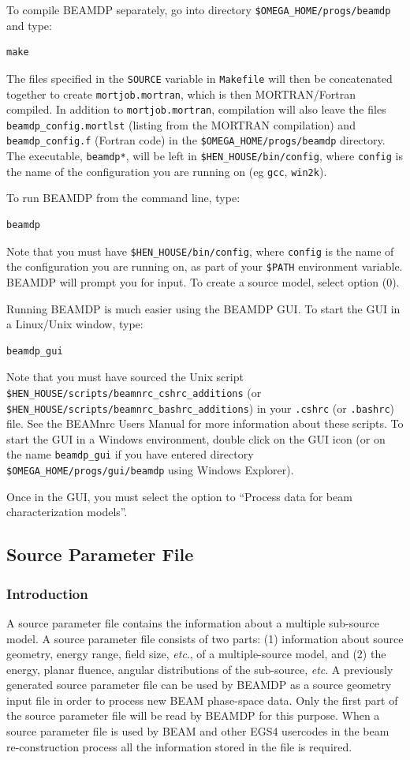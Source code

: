 \documentclass[12pt,twoside]{article}
\newcommand{\etc}{{\em etc}}
\begin{document}
To compile BEAMDP separately, go into directory {\tt \$OMEGA\_HOME/progs/beamdp}
and type:
\begin{verbatim}
make
\end{verbatim}
The files specified in the {\tt SOURCE} variable in {\tt Makefile}
will then be concatenated together to create {\tt mortjob.mortran}, which
is then MORTRAN/Fortran compiled.  In addition to {\tt mortjob.mortran},
compilation will also leave the files {\tt beamdp\_config.mortlst}
(listing from the MORTRAN compilation) and
{\tt beamdp\_config.f} (Fortran code) in the
{\tt \$OMEGA\_HOME/progs/beamdp} directory.  The executable, {\tt beamdp*},
will be left in {\tt \$HEN\_HOUSE/bin/config}, where {\tt config} is the
name of the configuration you are running on (eg {\tt gcc}, {\tt win2k}).

To run BEAMDP from the command line, type:
\begin{verbatim}
beamdp
\end{verbatim}
Note that you must
have {\tt \$HEN\_HOUSE/bin/config}, where {\tt config} is the name
of the configuration you are running on, as part of your {\tt \$PATH}
environment variable.
BEAMDP will prompt you for input.  To create a source model, select
option (0).

Running BEAMDP is much easier using the BEAMDP GUI\cite{Tr04}.  To start the GUI in
a Linux/Unix window, type:
\begin{verbatim}
beamdp_gui
\end{verbatim}
Note that you must have sourced the Unix script
{\tt \$HEN\_HOUSE/scripts/beamnrc\_cshrc\_additions} (or
{\tt \$HEN\_HOUSE/scripts/beamnrc\_bashrc\_additions}) in your
{\tt .cshrc} (or {\tt .bashrc}) file.  See the BEAMnrc Users Manual\cite{Ro04a}
for more information about these scripts.  To start the GUI in a Windows
environment, double click on the GUI icon (or on the name
{\tt beamdp\_gui} if you have entered directory
{\tt \$OMEGA\_HOME/progs/gui/beamdp} using Windows Explorer).

Once in the GUI, you must select the option to
``Process data for beam characterization models''.

\subsection{Source Parameter File}

\subsubsection{Introduction}
A source parameter file contains the information about a multiple sub-source model. A source parameter file consists of two parts: (1) information about source geometry, energy range, field size, \etc., of a multiple-source model, and (2) the energy, planar fluence, angular distributions of the sub-source, \etc.
A previously generated source parameter file  can be used by BEAMDP as a source geometry input file in order to process new BEAM phase-space data. Only the first part of the source parameter file will be read by BEAMDP for this purpose. When a source parameter file is used by BEAM and other EGS4 usercodes in the beam re-construction process all the information stored in the file is required.
\end{document}
